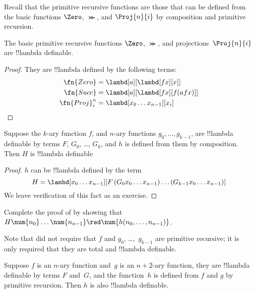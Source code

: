 \documentclass[../../../include/open-logic-section]{subfiles}
\begin{document}

Recall that the primitive recursive functions are those that can be
defined from the basic functions $\Zero$, $\Succ$, and $\Proj{n}{i}$
by composition and primitive recursion.

\begin{lem}
  The basic primitive recursive functions $\Zero$, $\Succ$, and
  projections~$\Proj{n}{i}$ are !!{lambda definable}.
\end{lem}

\begin{proof}
They are !!{lambda define}d by the following terms:
\begin{align*}
  \fn{Zero} & = \lambd[a][\lambd[fx][x]]\\
  \fn{Succ} & = \lambd[a][\lambd[fx][f (a f x)]] \\
  \fn{Proj}^n_i & = \lambd[x_0\dots x_{n-1}][x_i] \qedhere
\end{align*}
\end{proof}

\begin{lem}
   Suppose the $k$-ary function $f$, and $n$-ary
  functions $g_0, \dots, g_{k-1}$, are !!{lambda definable} by terms
  $F$, $G_0$, \dots, $G_k$, and $h$ is defined from them by composition.
  Then $H$ is !!{lambda definable}
\end{lem}

\begin{proof}
  $h$ can be !!{lambda define}d by the term
  \[
  H = \lambd[x_0 \dots x_{n-1}][F\, (G_0 x_0 \dots
    x_{n-1}) \dots (G_{k-1} x_0 \dots x_{n-1})]
  \]
  We leave verification of this fact as an exercise.
\end{proof}

\begin{prob}
  Complete the proof of  by showing
  that $H\num{n_0}\dots\num{n_{n-1}} \red \num{h(n_0, \dots,
    n_{n-1})}$.
\end{prob}

Note that  did not require that $f$ and $g_0$,
\dots,~$g_{k-1}$ are primitive recursive; it is only required that
they are total and !!{lambda definable}.

\begin{lem}
  Suppose $f$ is an $n$-ary function and~$g$ is an $n+2$-ary function,
  they are !!{lambda definable} by terms $F$ and~$G$, and the
  function~$h$ is defined from $f$ and $g$ by primitive
  recursion. Then $h$ is also !!{lambda definable}.
\end{lem}
\end{document}
